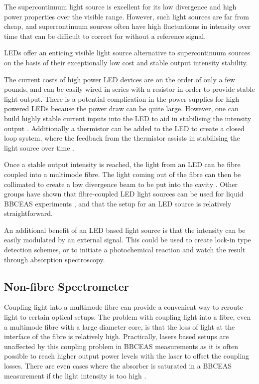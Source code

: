 The supercontinuum light source is excellent for its low divergence and high
power properties over the visible range. However, such light sources are far
from cheap, and supercontinuum sources often have high fluctuations in
intensity over time that can be difficult to correct for without a reference
signal.

\acp{LED} offer an enticing visible light source alternative to supercontinuum
sources on the basis of their exceptionally low cost and stable output
intensity stability.

The current costs of high power \ac{LED} devices are on the order of only a few
pounds, and can be easily wired in series with a resistor in order to provide
stable light output. There is a potential complication in the power supplies
for high powered \acp{LED} because the power draw can be quite large.  However,
one can build highly stable current inputs into the \ac{LED} to aid in
stabilising the intensity output \cite{patent_const_current}. Additionally a
thermistor can be added to the \ac{LED} to create a closed loop system, where
the feedback from the thermistor assists in stabilising the light source over
time \cite{Wieman:2000vd}.

Once a stable output intensity is reached, the light from an \ac{LED} can be
fibre coupled into a multimode fibre. The light coming out of the fibre can
then be collimated to create a low divergence beam to be put into the cavity
\cite{Berden:2009wk}.  Other groups have shown that fibre-coupled \ac{LED}
light sources can be used for liquid \ac{BBCEAS} experiments
\cite{Islam:2007ea,Seetohul:2009du}, and that the setup for an \ac{LED} source
is relatively straightforward.

An additional benefit of an \ac{LED} based light source is that the intensity
can be easily modulated by an external signal. This could be used to create
lock-in type detection schemes, or to initiate a photochemical reaction and
watch the result through absorption spectroscopy.



\subsection{Non-fibre Spectrometer}\label{subsec:bbceas_no_fibre}

Coupling light into a multimode fibre can provide a convenient way to reroute
light to certain optical setups. The problem with coupling light into a fibre,
even a multimode fibre with a large diameter core, is that the loss of light
at the interface of the fibre is relatively high. Practically, lasers based
setups are unaffected by this coupling problem in \ac{BBCEAS} measurements
as it is often possible to reach higher output power levels with the laser
to offset the coupling losses. There are even cases where the absorber is
saturated in a \ac{BBCEAS} measurement if the light intensity is too high
\cite{Giuliano:1967hw}.


